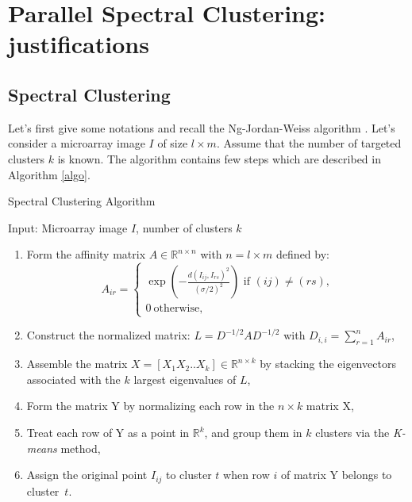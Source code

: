 \documentclass[runningheads,a4paper]{llncs}
\begin{document}
\section{Parallel Spectral Clustering: justifications}

\subsection{Spectral Clustering}
Let's first give some notations and recall the Ng-Jordan-Weiss  algorithm
\cite{speC}. Let's consider a microarray image $I$ of size $l \times m$.
Assume that the number of targeted clusters $k$ is known. The algorithm
contains few steps which are described in Algorithm \ref{algo}.
\begin{algorithm}
\caption{Spectral Clustering Algorithm}
Input: Microarray image $I$, number of clusters $k$
\begin{enumerate}
\item Form the affinity matrix $A\in\mathbb{R}^{n\times n}$  with $n=l\times m$ defined by:
\begin{equation}
A_{ir}=\begin{cases}
\exp\left(-\frac{d\left(I_{ij},I_{rs}\right)^2}{(\sigma/2)^2}\right) \text{\  if $(ij)\neq (rs)$,}\\ \nonumber
0 \ \text{otherwise,}
\end{cases}
\end{equation}
\item Construct the normalized matrix: $L=D^{-1/2}AD^{-1/2}$ with $D_{i,i}=\sum_{r=1}^{n} A_{ir} $,
\item Assemble the matrix $X=[X_1X_2..X_k]\in \mathbb{R}^{n\times k}$ by stacking the eigenvectors associated with the {$k$} largest eigenvalues of $L$,
\item Form the matrix Y by normalizing each row in the $n \times k$ matrix X,
\item Treat each row of Y as a point in $\mathbb{R}^{k}$, and group them in $k$ clusters via the {\it K-means} method,
\item Assign the original point $I_{ij}$ to cluster $t$ when row $i$ of matrix Y belongs to cluster~$t$. 
\end{enumerate}
\label{algo}
\end{algorithm}
\end{document}

